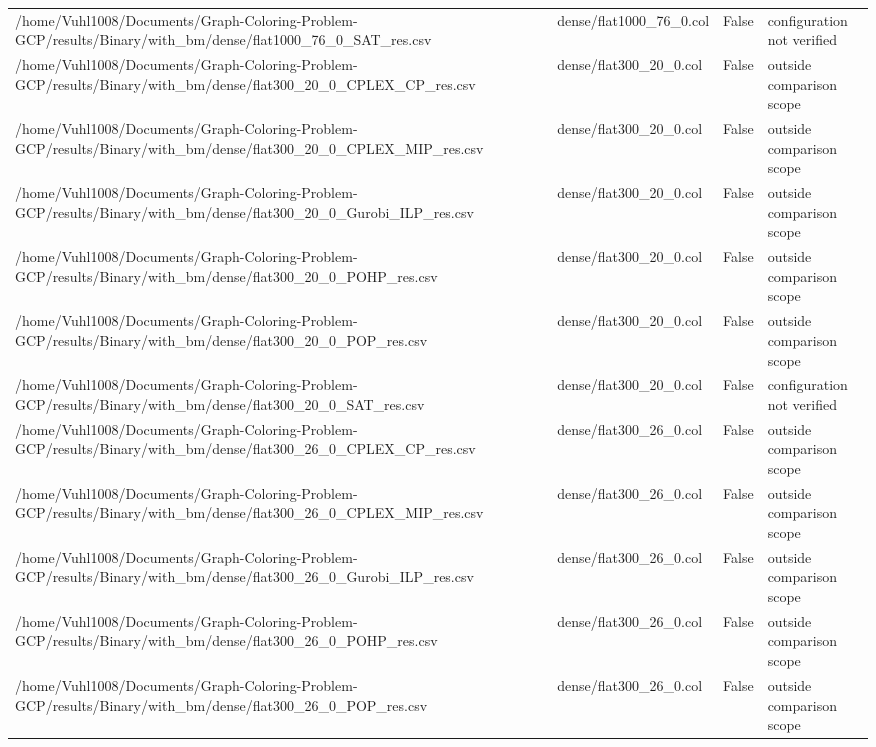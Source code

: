 \begin{table}[htbp]
\begin{tabular}{llll}
/home/Vuhl1008/Documents/Graph-Coloring-Problem-GCP/results/Binary/with\_bm/dense/flat1000\_76\_0\_SAT\_res.csv & dense/flat1000\_76\_0.col & False & configuration not verified \\
/home/Vuhl1008/Documents/Graph-Coloring-Problem-GCP/results/Binary/with\_bm/dense/flat300\_20\_0\_CPLEX\_CP\_res.csv & dense/flat300\_20\_0.col & False & outside comparison scope \\
/home/Vuhl1008/Documents/Graph-Coloring-Problem-GCP/results/Binary/with\_bm/dense/flat300\_20\_0\_CPLEX\_MIP\_res.csv & dense/flat300\_20\_0.col & False & outside comparison scope \\
/home/Vuhl1008/Documents/Graph-Coloring-Problem-GCP/results/Binary/with\_bm/dense/flat300\_20\_0\_Gurobi\_ILP\_res.csv & dense/flat300\_20\_0.col & False & outside comparison scope \\
/home/Vuhl1008/Documents/Graph-Coloring-Problem-GCP/results/Binary/with\_bm/dense/flat300\_20\_0\_POHP\_res.csv & dense/flat300\_20\_0.col & False & outside comparison scope \\
/home/Vuhl1008/Documents/Graph-Coloring-Problem-GCP/results/Binary/with\_bm/dense/flat300\_20\_0\_POP\_res.csv & dense/flat300\_20\_0.col & False & outside comparison scope \\
/home/Vuhl1008/Documents/Graph-Coloring-Problem-GCP/results/Binary/with\_bm/dense/flat300\_20\_0\_SAT\_res.csv & dense/flat300\_20\_0.col & False & configuration not verified \\
/home/Vuhl1008/Documents/Graph-Coloring-Problem-GCP/results/Binary/with\_bm/dense/flat300\_26\_0\_CPLEX\_CP\_res.csv & dense/flat300\_26\_0.col & False & outside comparison scope \\
/home/Vuhl1008/Documents/Graph-Coloring-Problem-GCP/results/Binary/with\_bm/dense/flat300\_26\_0\_CPLEX\_MIP\_res.csv & dense/flat300\_26\_0.col & False & outside comparison scope \\
/home/Vuhl1008/Documents/Graph-Coloring-Problem-GCP/results/Binary/with\_bm/dense/flat300\_26\_0\_Gurobi\_ILP\_res.csv & dense/flat300\_26\_0.col & False & outside comparison scope \\
/home/Vuhl1008/Documents/Graph-Coloring-Problem-GCP/results/Binary/with\_bm/dense/flat300\_26\_0\_POHP\_res.csv & dense/flat300\_26\_0.col & False & outside comparison scope \\
/home/Vuhl1008/Documents/Graph-Coloring-Problem-GCP/results/Binary/with\_bm/dense/flat300\_26\_0\_POP\_res.csv & dense/flat300\_26\_0.col & False & outside comparison scope \\

\end{tabular}
\end{table}
